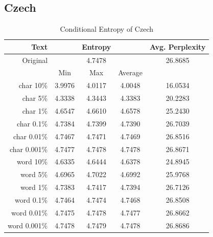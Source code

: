 \documentclass[a4paper]{article}
\begin{document}
\subsection{Czech}

\begin{table}[H]
    \centering
    \caption{Conditional Entropy of Czech\\}
    \label{tab:cz_entropy}
    \begin{tabular}{r|ccc|c}
        Text & & Entropy & & Avg. Perplexity \\
        \hline
        Original & &  4.7478 & & 26.8685 \\
        \hline
                 & Min & Max & Average & \\
        \hline
        char {10\%} & 3.9976 & 4.0117 & 4.0048 & 16.0534 \\
        char {5\%} & 4.3338 & 4.3443 & 4.3383 & 20.2283 \\
        char {1\%} & 4.6547 & 4.6610 & 4.6578 & 25.2430 \\
        char {0.1\%} & 4.7384 & 4.7399 & 4.7390 & 26.7039 \\
        char {0.01\%} & 4.7467 & 4.7471 & 4.7469 & 26.8516 \\
        char {0.001\%} & 4.7477 & 4.7478 & 4.7478 & 26.8671 \\
        \hline
        word {10\%} & 4.6335 & 4.6444 & 4.6378 & 24.8945 \\
        word {5\%} & 4.6965 & 4.7022 & 4.6992 & 25.9768 \\
        word {1\%} & 4.7383 & 4.7417 & 4.7394 & 26.7126 \\
        word {0.1\%} & 4.7464 & 4.7474 & 4.7468 & 26.8508 \\
        word {0.01\%} & 4.7475 & 4.7478 & 4.7477 & 26.8662 \\
        word {0.001\%} & 4.7478 & 4.7479 & 4.7478 & 26.8686 \\
    \end{tabular}
\end{table}
\end{document}
